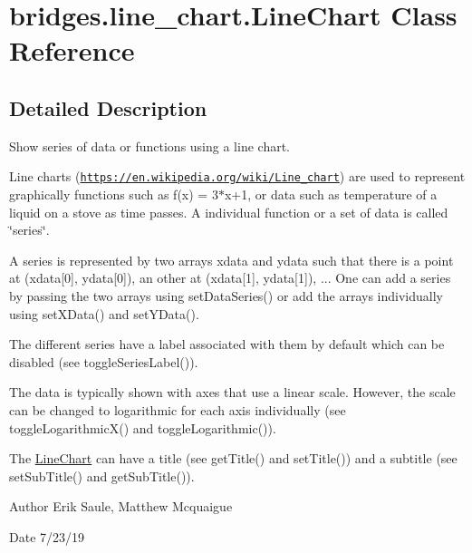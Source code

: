 \hypertarget{classbridges_1_1line__chart_1_1_line_chart}{}\section{bridges.\+line\+\_\+chart.\+Line\+Chart Class Reference}
\label{classbridges_1_1line__chart_1_1_line_chart}


\subsection{Detailed Description}
Show series of data or functions using a line chart. 

Line charts (\href{https://en.wikipedia.org/wiki/Line_chart}{\tt https\+://en.\+wikipedia.\+org/wiki/\+Line\+\_\+chart}) are used to represent graphically functions such as f(x) = 3$\ast$x+1, or data such as temperature of a liquid on a stove as time passes. A individual function or a set of data is called \char`\"{}series\char`\"{}.

A series is represented by two arrays xdata and ydata such that there is a point at (xdata\mbox{[}0\mbox{]}, ydata\mbox{[}0\mbox{]}), an other at (xdata\mbox{[}1\mbox{]}, ydata\mbox{[}1\mbox{]}), ... One can add a series by passing the two arrays using set\+Data\+Series() or add the arrays individually using set\+X\+Data() and set\+Y\+Data().

The different series have a label associated with them by default which can be disabled (see toggle\+Series\+Label()).

The data is typically shown with axes that use a linear scale. However, the scale can be changed to logarithmic for each axis individually (see toggle\+Logarithmic\+X() and toggle\+Logarithmic()).

The \hyperlink{classbridges_1_1line__chart_1_1_line_chart}{Line\+Chart} can have a title (see get\+Title() and set\+Title()) and a subtitle (see set\+Sub\+Title() and get\+Sub\+Title()).

\begin{DoxyAuthor}{Author}
Erik Saule, Matthew Mcquaigue
\end{DoxyAuthor}
\begin{DoxyDate}{Date}
7/23/19 
\end{DoxyDate}
